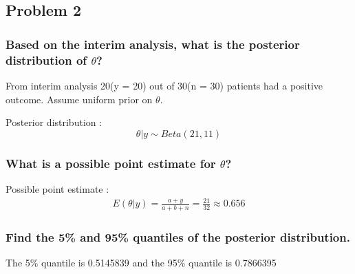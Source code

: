 \documentclass[
]{article}
\begin{document}
\hypertarget{problem-2}{%
\subsection{Problem 2}\label{problem-2}}

\hypertarget{based-on-the-interim-analysis-what-is-the-posterior-distribution-of-theta}{%
\subsubsection{\texorpdfstring{Based on the interim analysis, what is
the posterior distribution of
\(\theta\)?}{Based on the interim analysis, what is the posterior distribution of \textbackslash theta?}}\label{based-on-the-interim-analysis-what-is-the-posterior-distribution-of-theta}}

From interim analysis 20(y = 20) out of 30(n = 30) patients had a
positive outcome. Assume uniform prior on \(\theta\).

Posterior distribution : \[\theta|y \sim Beta(21, 11)\]

\hypertarget{what-is-a-possible-point-estimate-for-theta}{%
\subsubsection{\texorpdfstring{What is a possible point estimate for
\(\theta\)?}{What is a possible point estimate for \textbackslash theta?}}\label{what-is-a-possible-point-estimate-for-theta}}

Possible point estimate : \begin{align}
  E(\theta|y) = \frac{a+y}{a+b+n} 
  = \frac{21}{32}
  \approx 0.656
\end{align}

\hypertarget{find-the-5-and-95-quantiles-of-the-posterior-distribution.}{%
\subsubsection{Find the 5\% and 95\% quantiles of the posterior
distribution.}\label{find-the-5-and-95-quantiles-of-the-posterior-distribution.}}

The 5\% quantile is 0.5145839 and the 95\% quantile is 0.7866395
\end{document}

